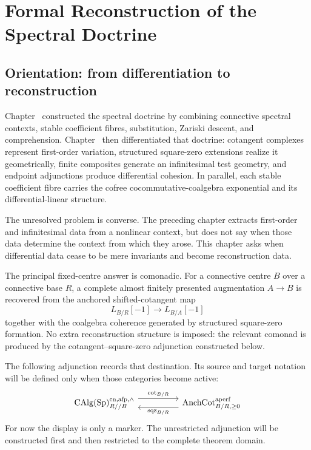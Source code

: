 \chapter{Formal Reconstruction of the Spectral Doctrine}
\label{chap:formal-reconstruction-spectral-doctrine}

\section{Orientation: from differentiation to reconstruction}
\label{sec:formal-reconstruction-orientation}

Chapter~ constructed the spectral doctrine by
combining connective spectral contexts, stable coefficient fibres, substitution, Zariski
descent, and comprehension. Chapter~ then
differentiated that doctrine: cotangent complexes represent first-order variation,
structured square-zero extensions realize it geometrically, finite composites generate
an infinitesimal test geometry, and endpoint adjunctions produce differential cohesion.
In parallel, each stable coefficient fibre carries the cofree cocommutative-coalgebra
exponential and its differential-linear structure.

The unresolved problem is converse. The preceding chapter extracts first-order and
infinitesimal data from a nonlinear context, but does not say when those data determine
the context from which they arose. This chapter asks when differential data cease to be
mere invariants and become reconstruction data.

The principal fixed-centre answer is comonadic. For a connective centre \(B\) over a
connective base \(R\), a complete almost finitely presented augmentation \(A\to B\) is
recovered from the anchored shifted-cotangent map
\[
    L_{B/R}[-1]\longrightarrow L_{B/A}[-1]
\]
together with the coalgebra coherence generated by structured square-zero formation. No
extra reconstruction structure is imposed: the relevant comonad is produced by the
cotangent--square-zero adjunction constructed below.

The following adjunction records that destination. Its source and target notation will
be defined only when those categories become active:
\[
\begin{tikzcd}[column sep=huge]
    \CAlg(\Sp)^{\mathrm{cn},\mathrm{afp},\wedge}_{R//B}
        \arrow[r,shift left=1.2ex,"\operatorname{cot}_{B/R}"]
        &
    \operatorname{AnchCot}^{\mathrm{aperf}}_{B/R,\geq0}
        \arrow[l,shift left=1.2ex,"\operatorname{sqz}_{B/R}"]
\end{tikzcd}
\]
For now the display is only a marker. The unrestricted adjunction will be constructed
first and then restricted to the complete theorem domain.


